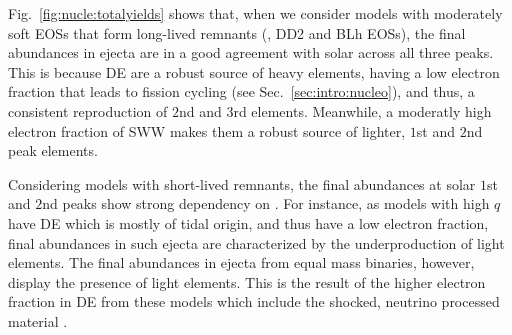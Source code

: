 Fig.~\ref{fig:nucle:totalyields} shows that, when we consider models with moderately 
soft \acp{EOS} that form long-lived remnants (\eg, DD2 and BLh \acp{EOS}),  the final \rproc{} abundances in ejecta are in a good agreement with solar across all three \rproc{} peaks.
This is because \ac{DE} are a robust source of heavy elements, having a low 
electron fraction that leads to fission cycling (see Sec.~\ref{sec:intro:nucleo}),
and thus, a consistent reproduction of $2$nd and $3$rd \rproc{} elements. 
Meanwhile, a moderatly high electron fraction of \ac{SWW} makes them 
a robust source of lighter, $1$st and $2$nd peak elements. 

Considering models with short-lived remnants, the final \rproc{} abundances 
at solar $1$st and $2$nd \rproc{} peaks show 
strong dependency on \mr{}. 
%
For instance, as models with high $q$ have \ac{DE} which is mostly of tidal origin, 
and thus have a low electron fraction, final \rproc{} abundances in such ejecta are characterized by the underproduction of light elements.
%
The final abundances in ejecta from equal mass binaries, 
however, display the presence of light \rproc{} elements. 
This is the result of the higher electron fraction in \ac{DE} from these models 
which include the shocked, neutrino processed material 
\citep{Wanajo:2014wha,Radice:2018pdn}. 

